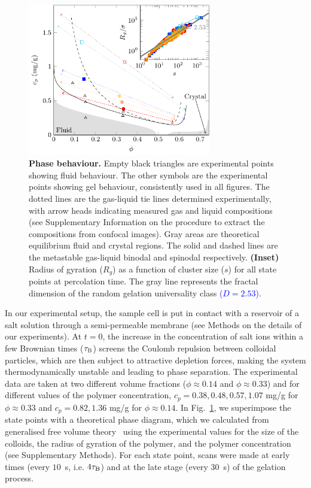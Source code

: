 \documentclass[preprint,amsmath,amssymb,superscriptaddress]{revtex4-1}
\begin{document}
\begin{figure}[h]
 \includegraphics[width=8cm]{network_formation.pdf}
 \caption{{\bf Phase behaviour.} 
Empty black triangles are experimental points showing fluid behaviour. The other symbols are the experimental points showing gel behaviour, consistently used in all figures. The dotted lines are the gas-liquid tie lines determined experimentally, with arrow heads indicating measured gas and liquid compositions (see Supplementary Information on the procedure to extract the compositions from confocal images).  Gray areas are theoretical equilibrium fluid and crystal regions. The solid and dashed lines are the metastable gas-liquid binodal and spinodal respectively.
\textbf{(Inset)} Radius of gyration ($R_g$) as a function of cluster size ($s$) for all state points at percolation time. The gray line represents the fractal dimension of the random gelation universality class \textcolor{blue}{($D=2.53$)}.
 }
 \label{fig:network_formation}
\end{figure}


In our experimental setup, the sample cell is put in contact with a reservoir of a salt solution through a semi-permeable membrane (see Methods 
on the details of our experiments).
At $t=0$, the increase in the concentration of salt ions within a few Brownian times ($\tau_{\rm B}$) screens the Coulomb repulsion between colloidal particles,
which are then subject to attractive depletion forces, making the system thermodynamically unstable and leading to phase separation. 
The experimental data are taken at two different volume fractions ($\phi\approx 0.14$ and $\phi\approx 0.33$) and for different values
of the polymer concentration, $c_p=0.38,0.48,0.57,1.07$ mg/g for $\phi\approx 0.33$ and $c_p=0.82,1.36$ mg/g for $\phi\approx 0.14$.
In Fig.~\ref{fig:network_formation}, we superimpose the state points with a theoretical phase diagram, which we calculated from generalised free volume theory~\cite{Fleer2008} using the experimental values for the size of the colloids, the radius of gyration of the polymer, and the polymer concentration (see Supplementary Methods).
For each state point, scans were made at early times (every $10$~s, i.e. $4\tau_{\rm B}$) and at the late stage (every $30$~s) of the gelation process. 
\end{document}

